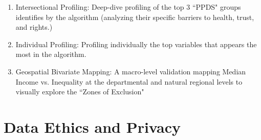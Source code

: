 \documentclass{article}
\begin{document}
\begin{enumerate}

    \item Intersectional Profiling: Deep-dive 
    profiling of the top 3 ``PPDS" groups 
    identifies by the algorithm (analyzing 
    their specific barriers to health, 
    trust, and rights.)

    \item Individual Profiling: Profiling 
    individually the top variables that 
    appears the most in the algorithm.

    \item Geospatial Bivariate Mapping: 
    A macro-level validation mapping Median
    Income vs. Inequality at the departmental
    and natural regional levels to visually 
    explore the ``Zones of Exclusion"
    
\end{enumerate}
\section{Data Ethics and Privacy}
\end{document}
